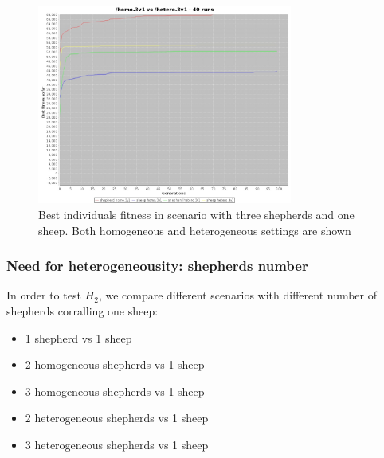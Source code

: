 \documentclass[conference]{IEEEtran}
\begin{document}
\begin{figure}[ht]
	\centering
	\includegraphics[width=3.3in]{imgs/homo3v1-hetero3v1-bestSoFar.jpeg}
	\caption{Best individuals fitness in scenario with three shepherds and one sheep. Both homogeneous and heterogeneous settings are shown}
	\label{fig:3v1_homo_vs_hetero}
\end{figure}


\vspace{0.5em}
\subsubsection{Need for heterogeneousity: shepherds number}
In order to test $H_2$, we compare different scenarios with different number of shepherds corralling one sheep:
\begin{itemize}
	\item 1 shepherd vs 1 sheep	
	\item 2 homogeneous shepherds vs 1 sheep
	\item 3 homogeneous shepherds vs 1 sheep
	\item 2 heterogeneous shepherds vs 1 sheep
	\item 3 heterogeneous shepherds vs 1 sheep
	
\end{itemize}

\vspace{0.5em}
\end{document}
